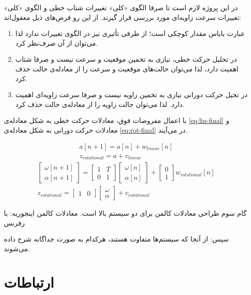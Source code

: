در این پروژه لازم است تا صرفا الگوی «کلی» تغییرات شتاب خطی و الگوی «کلی» تغییرات سرعت زاویه‌ای مورد بررسی قرار گیرند. از این رو فرض‌های ذیل معقول‌اند:
\begin{enumerate}
	\item عبارت بایاس مقدار کوچکی است؛ از طرفی تأثیری نیز در الگوی تغییرات ندارد لذا می‌توان از آن صرف‌نظر کرد.
	\item در تحلیل حرکت خطی، نیازی به تخمین موقعیت و سرعت نیست و صرفا شتاب اهمیت دارد، لذا می‌توان حالت‌های موقعیت و سرعت را از معادله‌ی حالت حذف کرد.
	\item در تحیل حرکت دورانی نیازی به تخمین زاویه نیست و صرفا سرعت زاویه‌ای اهمیت دارد. لذا می‌توان حالت زاویه را از معادله‌ی حالت حذف کرد.
\end{enumerate}

\newpage
با اعمال مفروضات فوق، معادلات حرکت خطی به شکل معادله‌ی \ref{eq:lin-final} و معادلات حرکت دورانی به شکل معادله‌ی \ref{eq:rot-final} در می‌آیند.

\begin{gather}
	a[n+1] = a[n] + w_{linear}[n] \nonumber
	\\
	z_{rotational} = a + v_{linear} 
	\label{eq:lin-final}
\end{gather}
\begin{gather}
	\begin{bmatrix}
		\omega[n+1] \\
		\alpha[n+1] 
	\end{bmatrix}
	=
	\begin{bmatrix}
		1 & T \\
		0 & 1
	\end{bmatrix}
	\begin{bmatrix}
		\omega[n] \\
		\alpha[n]
	\end{bmatrix}
	+
	\begin{bmatrix}
		0 \\
		1
	\end{bmatrix}
	w_{rotational}[n] \nonumber
	\\
	z_{rotational} = 
	\begin{bmatrix}
		1 & 0
	\end{bmatrix}
	\begin{bmatrix}
		\omega \\
		\alpha
	\end{bmatrix}
	+ v_{rotational} 
	\label{eq:rot-final}
\end{gather}

گام سوم طراحی معادلات کالمن برای دو سیستم بالا است. معادلات کالمن اینجوریه: با رفرنس

سپس: از آنجا که سیستم‌ها متفاوت هستند، هرکدام به صورت جداگانه شرح داده می‌شوند.

\section{ارتباطات} \label{sec:comm}